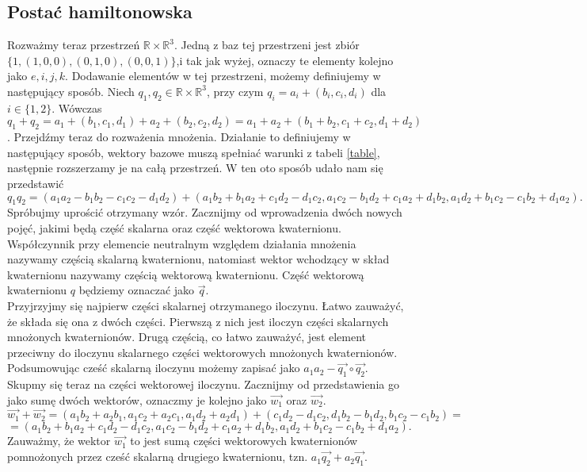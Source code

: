 \documentclass[a4paper,twoside,11pt,reqno]{mwrep}
\theoremstyle{plain} \newtheorem{twr}{Twierdzenie}
\theoremstyle{plain} \newtheorem{lem}{Lemat}
\theoremstyle{definition} \newtheorem{defi}{Definicja}
\theoremstyle{remark} \newtheorem*{wni}{Wniosek}
\theoremstyle{definition} \newtheorem{uwaga}{Uwaga}
\theoremstyle{definition}\newtheorem{prz}{Przykład}
\begin{document}
\subsection{Postać hamiltonowska}
Rozważmy teraz przestrzeń $\mathbb{R}\times \mathbb{R}^3$. Jedną z baz
tej przestrzeni jest zbiór\\
$\{ 1,(1,0,0),(0,1,0),(0,0,1) \}$,i tak jak wyżej, oznaczy te elementy kolejno
jako $e,i,j,k$. Dodawanie elementów w tej przestrzeni, możemy definiujemy w następujący sposób.
Niech $q_1,q_2\in\mathbb{R}\times \mathbb{R}^3$, przy czym  $q_i =a_i +(b_i,c_i,d_i)$ 
dla $i\in \{ 1,2\}$. Wówczas
$$q_1+q_2=a_1 +(b_1,c_1,d_1) + a_2 +(b_2,c_2,d_2) = a_1+a_2 +(b_1+b_2,c_1+c_2,d_1+d_2)$$.
Przejdźmy teraz do rozważenia mnożenia. Działanie to definiujemy w następujący sposób,
wektory bazowe muszą spełniać warunki z tabeli \ref{table}, następnie rozszerzamy
je na całą przestrzeń. W ten oto sposób udało nam się przedstawić 
$$q_1q_2= (a_1 a_2-b_1b_2-c_1c_2-d_1d_2)+(a_1b_2+b_1a_2+c_1d_2-d_1c_2,a_1c_2-b_1d_2+c_1a_2+d_1b_2,a_1d_2+b_1c_2-c_1b_2+d_1a_2).$$
Spróbujmy uprościć otrzymany wzór. Zacznijmy od wprowadzenia dwóch nowych pojęć, jakimi będą
część skalarna oraz część wektorowa kwaternionu. 
Współczynnik przy elemencie neutralnym względem działania mnożenia nazywamy częścią skalarną kwaternionu,
natomiast wektor wchodzący w skład kwaternionu nazywamy częścią wektorową kwaternionu.
Część wektorową kwaternionu $q$ będziemy oznaczać jako $\overrightarrow{q}$.\\ %
\indent
Przyjrzyjmy się najpierw części skalarnej otrzymanego iloczynu. Łatwo zauważyć, 
że składa się ona z dwóch części. Pierwszą z nich jest iloczyn części skalarnych
mnożonych kwaternionów. Drugą częścią, co łatwo zauważyć, jest element przeciwny do iloczynu skalarnego części wektorowych mnożonych kwaternionów. 
Podsumowując cześć skalarną iloczynu możemy zapisać jako 
$a_1a_2 - \overrightarrow{q_1}\circ\overrightarrow{q_2}$.\\
\indent
Skupmy się teraz na części wektorowej iloczynu. Zacznijmy od przedstawienia go jako sumę 
dwóch wektorów, oznaczmy je kolejno jako $\overrightarrow{w_1}$ oraz $\overrightarrow{w_2}$.
$$\overrightarrow{w_1}+\overrightarrow{w_2}=(a_1b_2 +a_2b_1 ,a_1c_2+a_2c_1,a_1d_2+a_2d_1) + 
(c_1d_2-d_1c_2,
d_1b_2-b_1d_2,
b_1c_2-c_1b_2)= $$
$$=(a_1b_2+b_1a_2+c_1d_2-d_1c_2,
a_1c_2-b_1d_2+c_1a_2+d_1b_2,
a_1d_2+b_1c_2-c_1b_2+d_1a_2).$$ 
Zauważmy, że wektor $\overrightarrow{w_1}$ to jest sumą części wektorowych kwaternionów
pomnożonych przez cześć skalarną drugiego kwaternionu, tzn. 
$a_1\overrightarrow{q_2}+a_2\overrightarrow{q_1}$.\\
\end{document}
